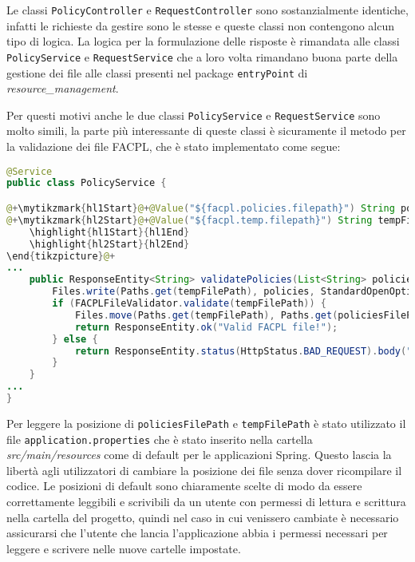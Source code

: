 Le classi \texttt{PolicyController} e \texttt{RequestController} sono sostanzialmente identiche, infatti le richieste da gestire sono le stesse e queste classi non contengono alcun tipo di logica. La logica per la formulazione delle risposte è rimandata alle classi \texttt{PolicyService} e \texttt{RequestService} che a loro volta rimandano buona parte della gestione dei file alle classi presenti nel package \texttt{entryPoint} di \emph{resource\_management}.\par
Per questi motivi anche le due classi \texttt{PolicyService} e \texttt{RequestService} sono molto simili, la parte più interessante di queste classi è sicuramente il metodo per la validazione dei file FACPL, che è stato implementato come segue:
\begin{lstlisting}[language=Java, caption=Metodo validatePolicies, label=code:PolicyServiceValidate, basicstyle=\fontsize{9}{11}\ttfamily]
@Service
public class PolicyService {

@+\mytikzmark{hl1Start}@+@Value("${facpl.policies.filepath}") String policiesFilePath;@+\mytikzmark{hl1End}@+
@+\mytikzmark{hl2Start}@+@Value("${facpl.temp.filepath}") String tempFilePath;@+\mytikzmark{hl2End}@+@+\begin{tikzpicture}[remember picture, overlay]
    \highlight{hl1Start}{hl1End}
    \highlight{hl2Start}{hl2End}
\end{tikzpicture}@+
...
    public ResponseEntity<String> validatePolicies(List<String> policies) throws IOException {
        Files.write(Paths.get(tempFilePath), policies, StandardOpenOption.CREATE, StandardOpenOption.TRUNCATE_EXISTING);
        if (FACPLFileValidator.validate(tempFilePath)) {
            Files.move(Paths.get(tempFilePath), Paths.get(policiesFilePath), StandardCopyOption.REPLACE_EXISTING);
            return ResponseEntity.ok("Valid FACPL file!");
        } else {
            return ResponseEntity.status(HttpStatus.BAD_REQUEST).body("Policy validation failed");
        }
    }
...
}
\end{lstlisting}
Per leggere la posizione di \texttt{policiesFilePath} e \texttt{tempFilePath} è stato utilizzato il file \texttt{application.properties} che è stato inserito nella cartella \emph{src/main/resources} come di default per le applicazioni Spring. Questo lascia la libertà agli utilizzatori di cambiare la posizione dei file senza dover ricompilare il codice. Le posizioni di default sono chiaramente scelte di modo da essere correttamente leggibili e scrivibili da un utente con permessi di lettura e scrittura nella cartella del progetto, quindi nel caso in cui venissero cambiate è necessario assicurarsi che l'utente che lancia l'applicazione abbia i permessi necessari per leggere e scrivere nelle nuove cartelle impostate.\break
